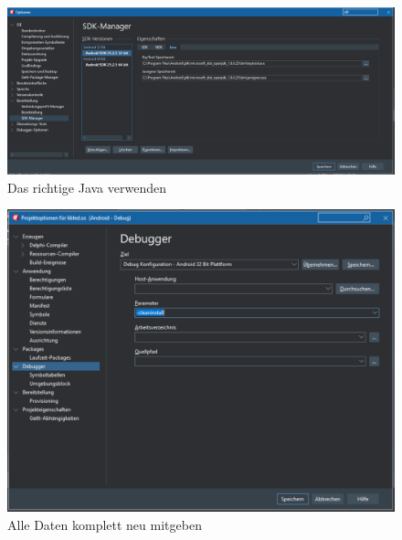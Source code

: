 \begin{figure}[h]
\begin{center}
\includegraphics[width=15cm]{img/keytoolexe.png}
\caption{Das richtige Java verwenden}
\label{keytoolexe}
\end{center}
\end{figure}

\begin{figure}[h]
\begin{center}
\includegraphics[width=15cm]{img/cleaninstall.png}
\caption{Alle Daten komplett neu mitgeben}
\label{cleaninstall}
\end{center}
\end{figure}

